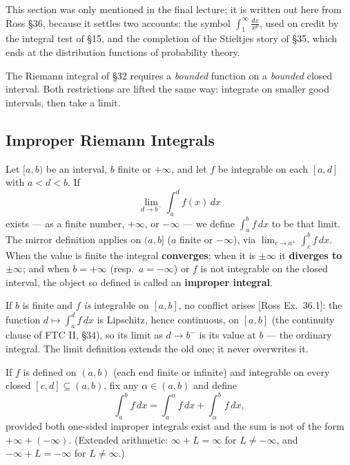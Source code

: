 \documentclass[11pt]{report}
\begin{document}
\begin{rembox}[Provenance]
This section was only mentioned in the final lecture; it is written out here from Ross \S 36, because it settles two accounts: the symbol $\int_1^\infty \tfrac{dx}{x^p}$, used on credit by the integral test of \S 15, and the completion of the Stieltjes story of \S 35, which ends at the distribution functions of probability theory.
\end{rembox}

The Riemann integral of \S 32 requires a \emph{bounded} function on a \emph{bounded} closed interval. Both restrictions are lifted the same way: integrate on smaller good intervals, then take a limit.

\subsection{Improper Riemann Integrals}

\begin{defbox}
Let $[a, b)$ be an interval, $b$ finite or $+\infty$, and let $f$ be integrable on each $[a, d]$ with $a < d < b$. If
\[
\lim_{d \to b^-} \int_a^d f(x)\,dx
\]
exists --- as a finite number, $+\infty$, or $-\infty$ --- we define $\int_a^b f\,dx$ to be that limit. The mirror definition applies on $(a, b]$ ($a$ finite or $-\infty$), via $\lim_{c \to a^+} \int_c^b f\,dx$. When the value is finite the integral \textbf{converges}; when it is $\pm\infty$ it \textbf{diverges to} $\pm\infty$; and when $b = +\infty$ (resp.\ $a = -\infty$) or $f$ is not integrable on the closed interval, the object so defined is called an \textbf{improper integral}.
\end{defbox}

\begin{rembox}
If $b$ is finite and $f$ \emph{is} integrable on $[a,b]$, no conflict arises [Ross Ex.\ 36.1]: the function $d \mapsto \int_a^d f\,dx$ is Lipschitz, hence continuous, on $[a,b]$ (the continuity clause of FTC II, \S 34), so its limit as $d \to b^-$ is its value at $b$ --- the ordinary integral. The limit definition extends the old one; it never overwrites it.
\end{rembox}

\begin{defbox}
If $f$ is defined on $(a, b)$ (each end finite or infinite) and integrable on every closed $[c, d] \subseteq (a,b)$, fix any $\alpha \in (a,b)$ and define
\[
\int_a^b f\,dx = \int_a^\alpha f\,dx + \int_\alpha^b f\,dx,
\]
provided both one-sided improper integrals exist and the sum is not of the form $+\infty + (-\infty)$. (Extended arithmetic: $\infty + L = \infty$ for $L \neq -\infty$, and $-\infty + L = -\infty$ for $L \neq \infty$.)
\end{defbox}
\end{document}
